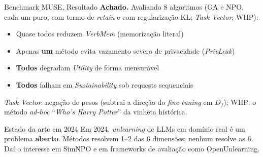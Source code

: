 \documentclass[aspectratio=169,xcolor=dvipsnames]{beamer}
\begin{document}
  \begin{frame}{Benchmark MUSE, Resultado}
    \textbf{Achado.} Avaliando 8 algoritmos (GA e NPO, cada um puro, com termo de \textit{retain} e com regularização KL; \textit{Task Vector}; WHP):
    \begin{itemize}\setlength{\itemsep}{0.3em}
      \item Quase todos reduzem \textit{VerbMem} (memorização literal)
      \item Apenas \textbf{um} método evita vazamento severo de privacidade (\textit{PrivLeak})
      \item \textbf{Todos} degradam \textit{Utility} de forma mensurável
      \item \textbf{Todos} falham em \textit{Sustainability} sob requests sequenciais
    \end{itemize}

    \vspace{0.2em}
    {\footnotesize \textit{Task Vector}: negação de pesos (subtrai a direção do \textit{fine-tuning} em $D_f$); WHP: o método \textit{ad-hoc} ``\textit{Who's Harry Potter}'' da vinheta histórica.}

    \vspace{0.3em}
    \begin{alertblock}{Estado da arte em 2024}
      Em 2024, \textit{unlearning} de LLMs em domínio real é um problema \textbf{aberto}. Métodos resolvem 1--2 das 6 dimensões; nenhum resolve as 6. Daí o interesse em SimNPO e em frameworks de avaliação como OpenUnlearning.
    \end{alertblock}
  \end{frame}
\end{document}
